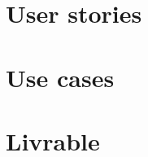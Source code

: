 \documentclass{article}
\begin{document}
\newpage

\pagebreak

\section{User stories}\label{sec:annexe-user-stories}



\section{Use cases}\label{sec:annexe-use-case}



\section{Livrable}\label{sec:annexe-livrable}



\pagebreak

 

\end{document}
